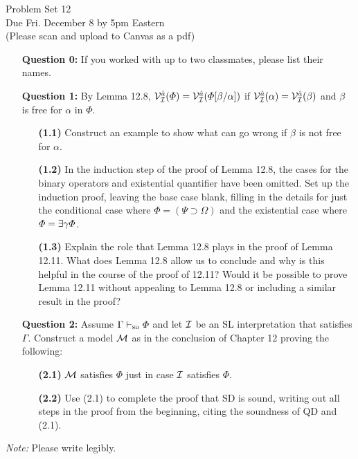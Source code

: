 \documentclass[12pt]{article}
\def\metaA{\ensuremath{\varPhi}}
\def\metaB{\ensuremath{\varPsi}}
\def\metaC{\ensuremath{\varOmega}}
\begin{document}
% 
% 

\thispagestyle{empty}



\begin{center}
\Large Problem Set 12\\[1ex] 
 Due Fri. December 8 by 5pm Eastern\\ 
  \vspace{.1in}
  \normalsize{(Please scan and upload to Canvas as a pdf)} \\[3ex] 
\end{center}


\begin{enumerate}[leftmargin=.75in]
  \item[\bf Question 0:] If you worked with up to two classmates, please list their names.
  \item[\bf Question 1:] By Lemma 12.8, $\VV{\I}{\va{a}}(\metaA)=\VV{\I}{\va{a}}(\metaA\unisub{\beta}{\alpha})$ if $\mathcal{V}_{\mathcal{I}}^{\hat{a}}(\alpha)=\mathcal{V}_{\mathcal{I}}^{\hat{a}}(\beta)$ and $\beta$ is free for $\alpha$ in $\metaA$.
    \begin{itemize}
      \item[\bf (1.1)] Construct an example to show what can go wrong if $\beta$ is not free for $\alpha$.
      \item[\bf (1.2)] In the induction step of the proof of Lemma 12.8, the cases for the binary operators and existential quantifier have been omitted. Set up the induction proof, leaving the base case blank, filling in the details for just the conditional case where $\metaA=(\metaB\supset\metaC)$ and the existential case where $\metaA=\qt{\exists}{\gamma}\metaA$.
      \item[\bf (1.3)] Explain the role that Lemma 12.8 plays in the proof of Lemma 12.11. What does Lemma 12.8 allow us to conclude and why is this helpful in the course of the proof of 12.11? Would it be possible to prove Lemma 12.11 without appealing to Lemma 12.8 or including a similar result in the proof?
    \end{itemize}
  \item[\bf Question 2:] Assume $\Gamma\proves_{\textsc{sd}}\metaA$ and let $\mathcal{I}$ be an SL interpretation that satisfies $\Gamma$. Construct a model $\mathcal{M}$ as in the conclusion of Chapter 12 proving the following:
    \begin{itemize}
      \item[\bf (2.1)] $\mathcal{M}$ satisfies $\metaA$ just in case $\mathcal{I}$ satisfies $\metaA$.
      \item[\bf (2.2)] Use (2.1) to complete the proof that SD is sound, writing out all steps in the proof from the beginning, citing the soundness of QD and (2.1).
    \end{itemize}
\end{enumerate}

\textit{Note:} Please write legibly.
\end{document}
